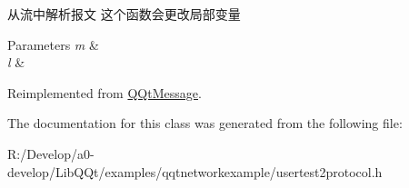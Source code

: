 从流中解析报文 这个函数会更改局部变量 


\begin{DoxyParams}{Parameters}
{\em m} & \\
\hline
{\em l} & \\
\hline
\end{DoxyParams}


Reimplemented from \mbox{\hyperlink{class_q_qt_message_a0bc25669bdd61490b1d8df6d77565f31}{Q\+Qt\+Message}}.



The documentation for this class was generated from the following file\+:\begin{DoxyCompactItemize}
\item 
R\+:/\+Develop/a0-\/develop/\+Lib\+Q\+Qt/examples/qqtnetworkexample/usertest2protocol.\+h\end{DoxyCompactItemize}
